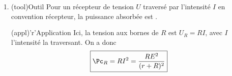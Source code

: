 \documentclass[../../main/main.tex]{subfiles}
\begin{document}
{\begin{enumerate}
		\item
		      \begin{tcbraster}[raster columns=2, raster equal height=rows]
			      \begin{tcb}(tool){Outil}
				      Pour un récepteur de tension $U$ traversé par l'intensité $I$ en
				      convention récepteur, la puissance absorbée est .
			      \end{tcb}
			      \begin{tcb}(appl)'r'{Application}
				      Ici, la tension aux bornes de $R$ est $U_R = RI$, avec $I$ l'intensité
				      la traversant. On a donc
				      \begin{equation*}
					      \boxed{\Pc_R = RI^2 = \frac{RE^2}{(r+R)^2}}
				      \end{equation*}
			      \end{tcb}
		      \end{tcbraster}


\end{enumerate}}
\end{document}
